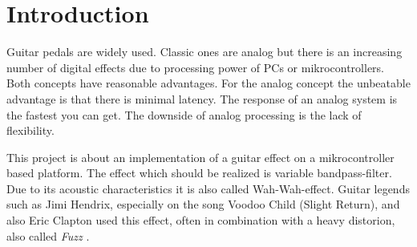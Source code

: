 \section{Introduction}

Guitar pedals are widely used. Classic ones are analog but there is an increasing number of
digital effects due to processing power of PCs or mikrocontrollers. Both concepts have
reasonable advantages. For the analog concept the unbeatable advantage is that there is
minimal latency. The response of an analog system is the fastest you can get. The downside of analog
processing is the lack of flexibility. %

This project is about an implementation of a guitar effect on a mikrocontroller based platform.
The effect which should be realized is variable bandpass-filter.
Due to its acoustic characteristics it is also called \frqq Wah-Wah\flqq-effect.
Guitar legends such as Jimi Hendrix, especially on the song Voodoo Child (Slight Return),
and also Eric Clapton used this effect, often in combination with a heavy distorion, also called \textit{Fuzz}
\cite{dailey_e_guitar} \cite{wiki_wahwah}.
